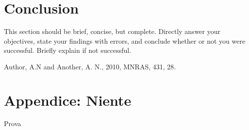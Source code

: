 \documentclass[letterpaper,11pt]{article}
\begin{document}
\section{Conclusion}
This section should be brief, concise, but complete. Directly answer your objectives, state your findings with errors, and conclude whether or not you were successful. Briefly explain if not successful.

\begin{thebibliography}{99}

Author, A.N and Another, A. N., 2010, MNRAS, 431, 28.

\end{thebibliography}

\appendix

\section*{Appendice: Niente}

Prova
\end{document}
